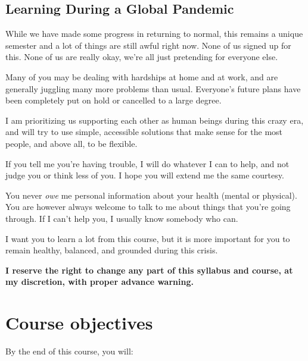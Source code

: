 \documentclass{article}
\begin{document}
\hypertarget{learning-during-a-global-pandemic}{%
\subsection{Learning During a Global
Pandemic}\label{learning-during-a-global-pandemic}}

While we have made some progress in returning to normal, this remains a
unique semester and a lot of things are still awful right now. None of
us signed up for this. None of us are really okay, we're all just
pretending for everyone else.

Many of you may be dealing with hardships at home and at work, and are
generally juggling many more problems than usual. Everyone's future
plans have been completely put on hold or cancelled to a large degree.

I am prioritizing us supporting each other as human beings during this
crazy era, and will try to use simple, accessible solutions that make
sense for the most people, and above all, to be flexible.

If you tell me you're having trouble, I will do whatever I can to help,
and not judge you or think less of you. I hope you will extend me the
same courtesy.

You never \emph{owe} me personal information about your health (mental
or physical). You are however always welcome to talk to me about things
that you're going through. If I can't help you, I usually know somebody
who can.

I want you to learn a lot from this course, but it is more important for
you to remain healthy, balanced, and grounded during this crisis.

\textbf{I reserve the right to change any part of this syllabus and
course, at my discretion, with proper advance warning.}

\hypertarget{course-objectives}{%
\section{Course objectives}\label{course-objectives}}

{By the end of this course,} you will:
\end{document}
